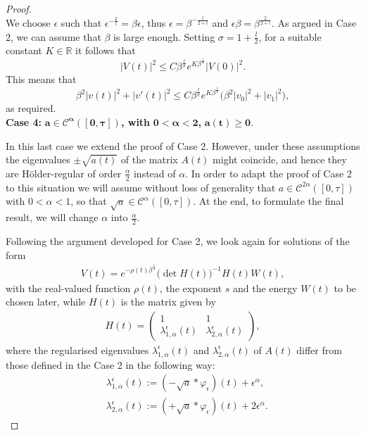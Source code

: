 \documentclass[12pt,oneside,a4paper]{book}
\numberwithin{equation}{section}     %
\theoremstyle{plain}
\theoremstyle{definition}
\newcommand{\R}{{\mathbb R}}
\begin{document}
\begin{proof}
\[	\]
	We choose $\epsilon$ such that $\epsilon^{-\frac{2}{l}}=\beta\epsilon$, thus $\epsilon=\beta^{-\frac{l}{2+l}}$ and $\epsilon\beta=\beta^{\frac{2}{2+l}}$. 
	As argued in Case 2, we can assume that $\beta$ is large enough.
	Setting $\sigma=1+\frac{l}{2}$, for a suitable constant $K\in\R$ it follows that
	\[
	|V(t)|^2\leq C \beta^{\frac{l}{\sigma}}e^{K\beta^{\frac{1}{\sigma}}}|V(0)|^2.
	\]
	This means that
	\[
	\beta^2|v(t)|^2+|v'(t)|^2\leq C \beta^\frac{l}{\sigma}e^{K\beta^{\frac{1}{\sigma}}}\big(\beta^2 |v_0|^2+|v_1|^2\big),
	\]
	as required.\\
	
	\textbf{Case 4:} $\bm{a\in\mathcal C^\alpha([0,\tau])}$\textbf{, with} $\bm{0<\alpha<2}$\textbf{,} $\mathbf{a(t)\geq0}$.
	
	In this last case we extend the proof of Case 2. However, under these assumptions the eigenvalues $\pm\sqrt{a(t)}$ of the matrix $A(t)$ might coincide, and hence they are H\"older-regular of order $\frac{\alpha}{2}$ instead of $\alpha$. In order to adapt the proof of Case 2 to this situation we will assume without loss of generality that $a\in\mathcal C^{2\alpha}([0,\tau])$ with $0<\alpha<1$, so that  $\sqrt{a}\in\mathcal C^\alpha([0,\tau])$. At the end, to formulate the final result, we will change $\alpha$ into $\frac\alpha{2}.$
	
	Following the argument developed for Case 2, we look again for solutions of the form
	\begin{align*}
	V(t)=e^{-\rho(t)\beta^{\frac{1}{s}}}\big(\det  H(t)\big)^{-1}H(t)W(t),
	\end{align*}
	with the real-valued function $\rho(t)$, the exponent $s$ and the energy $W(t)$ to be chosen later, while $H(t)$ is the matrix given by
	\begin{align*} 
	H(t)=\begin{pmatrix}
	1 & 1\\
	\lambda^\epsilon_{1,\alpha}(t) & \lambda^\epsilon_{2,\alpha}(t)
	\end{pmatrix},
	\end{align*}
	where the regularised eigenvalues $\lambda^\epsilon_{1,\alpha}(t)$ and $\lambda^\epsilon_{2,\alpha}(t)$ of $A(t)$ differ from those defined in the Case 2 in the following way:
	\begin{align*}
	&\lambda^\epsilon_{1,\alpha}(t):=(-\sqrt{a}*\varphi_\epsilon)(t)+\epsilon^\alpha,\\
	&\lambda^\epsilon_{2,\alpha}(t):=(+\sqrt{a}*\varphi_\epsilon)(t)+2\epsilon^\alpha.
	\end{align*}
	

\end{proof}
\end{document}
